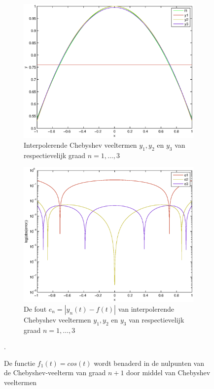 \documentclass[a4paper]{article}
\begin{document}
\begin{figure}
    \centering
    \begin{subfigure}[b]{\textwidth}
        \centering
        \includegraphics[width=\textwidth]{Jona/cheby_cos_interpolation.eps}
        \caption{Interpolerende Chebyshev veeltermen $y_{1},y_{2}$ en $y_{3}$ van respectievelijk graad $n=1,\dots,3$}
    \label{fig:cheb_cos_interpol}
    \end{subfigure}
    \begin{subfigure}[b]{\textwidth}
        \centering
        \includegraphics[width=\textwidth]{Jona/cheby_cos_error.eps}
        \caption{De fout $e_{n} = |y_{n}(t)-f(t)|$ van interpolerende Chebyshev veeltermen $y_{1},y_{2}$ en $y_{3}$ van respectievelijk graad $n=1,\dots,3$}
        \label{fig:cheb_cos_error}
    \end{subfigure}
    \caption{De functie $f_{1}(t) = cos(t)$ wordt benaderd in de nulpunten van de Chebyshev-veelterm van graad $n+1$ door middel van Chebyshev veeltermen}\label{fig:cheb_cos}.
\end{figure}
\end{document}

